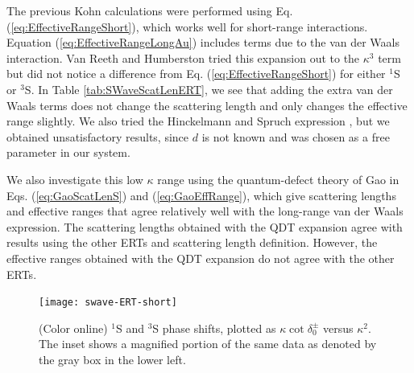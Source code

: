 \documentclass[preprint,showpacs,preprintnumbers,amsmath,amssymb,longbibliography,pra,aps]{revtex4-1}
\begin{document}
The previous Kohn calculations \cite{VanReeth2003} were performed using Eq. (\ref{eq:EffectiveRangeShort}), which works well for short-range interactions. Equation (\ref{eq:EffectiveRangeLongAu}) includes terms due to the van der Waals interaction. Van Reeth and Humberston \cite{VanReeth2003} tried this expansion out to the $\kappa^3$ term but did not notice a difference from Eq. (\ref{eq:EffectiveRangeShort}) for either $^1$S or $^3$S. In Table \ref{tab:SWaveScatLenERT}, we see that adding the extra van der Waals terms does not change the scattering length and only changes the effective range slightly. We also tried the Hinckelmann and Spruch expression \cite{Hinckelmann1971}, but we obtained unsatisfactory results, since $d$ is not known and was chosen as a free parameter in our system.

We also investigate this low $\kappa$ range using the quantum-defect theory of Gao \cite{Gao1998} in Eqs. (\ref{eq:GaoScatLenS}) and (\ref{eq:GaoEffRange}), which give scattering lengths and effective ranges that agree relatively well with the long-range van der Waals expression. The scattering lengths obtained with the QDT expansion agree with results using the other ERTs and scattering length definition. However, the effective ranges obtained with the QDT expansion do not agree with the other ERTs.

\begin{figure}[H]
	\centering
	\texttt{[image: swave-ERT-short]}
	\caption{(Color online) $^1$S and $^3$S phase shifts, plotted as $\kappa \cot \delta_0^\pm$ versus $\kappa^2$. The inset shows a magnified portion of the same data as denoted by the gray box in the lower left.}
	\label{fig:swave-ERT-short}
\end{figure}
\end{document}
